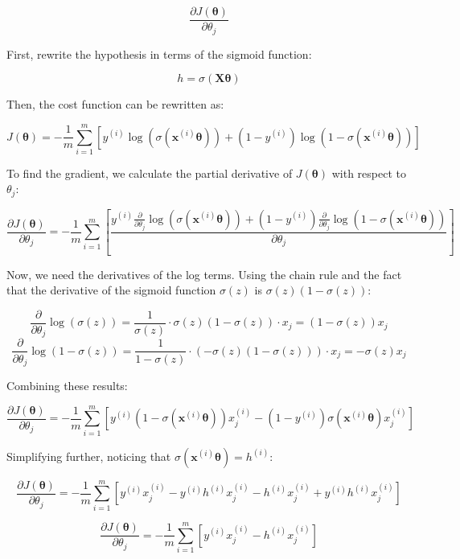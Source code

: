 \[
\frac{\partial J(\boldsymbol{\theta})}{\partial \theta_j}
\]

First, rewrite the hypothesis in terms of the sigmoid function:

\[
h = \sigma(\mathbf{X} \boldsymbol{\theta})
\]

Then, the cost function can be rewritten as:

\[
J(\boldsymbol{\theta}) = -\frac{1}{m} \sum_{i=1}^m \left[ y^{(i)} \log(\sigma(\mathbf{x}^{(i)} \boldsymbol{\theta})) + (1 - y^{(i)}) \log(1 - \sigma(\mathbf{x}^{(i)} \boldsymbol{\theta})) \right]
\]

To find the gradient, we calculate the partial derivative of $J(\boldsymbol{\theta})$ with respect to $\theta_j$:

\[
\frac{\partial J(\boldsymbol{\theta})}{\partial \theta_j} = -\frac{1}{m} \sum_{i=1}^m \left[ \frac{y^{(i)} \frac{\partial}{\partial \theta_j} \log(\sigma(\mathbf{x}^{(i)} \boldsymbol{\theta})) + (1 - y^{(i)}) \frac{\partial}{\partial \theta_j} \log(1 - \sigma(\mathbf{x}^{(i)} \boldsymbol{\theta}))}{\partial \theta_j} \right]
\]

Now, we need the derivatives of the log terms. Using the chain rule and the fact that the derivative of the sigmoid function $\sigma(z)$ is $\sigma(z)(1 - \sigma(z))$:

\[
\frac{\partial}{\partial \theta_j} \log(\sigma(z)) = \frac{1}{\sigma(z)} \cdot \sigma(z)(1 - \sigma(z)) \cdot x_j = (1 - \sigma(z)) x_j
\]
\[
\frac{\partial}{\partial \theta_j} \log(1 - \sigma(z)) = \frac{1}{1 - \sigma(z)} \cdot (-\sigma(z)(1 - \sigma(z))) \cdot x_j = -\sigma(z) x_j
\]

Combining these results:

\[
\frac{\partial J(\boldsymbol{\theta})}{\partial \theta_j} = -\frac{1}{m} \sum_{i=1}^m \left[ y^{(i)} (1 - \sigma(\mathbf{x}^{(i)} \boldsymbol{\theta})) x_j^{(i)} - (1 - y^{(i)}) \sigma(\mathbf{x}^{(i)} \boldsymbol{\theta}) x_j^{(i)} \right]
\]

Simplifying further, noticing that $\sigma(\mathbf{x}^{(i)} \boldsymbol{\theta}) = h^{(i)}$:

\[
\frac{\partial J(\boldsymbol{\theta})}{\partial \theta_j} = -\frac{1}{m} \sum_{i=1}^m \left[ y^{(i)} x_j^{(i)} - y^{(i)} h^{(i)} x_j^{(i)} - h^{(i)} x_j^{(i)} + y^{(i)} h^{(i)} x_j^{(i)} \right]
\]

\[
\frac{\partial J(\boldsymbol{\theta})}{\partial \theta_j} = -\frac{1}{m} \sum_{i=1}^m \left[ y^{(i)} x_j^{(i)} - h^{(i)} x_j^{(i)} \right]
\]

